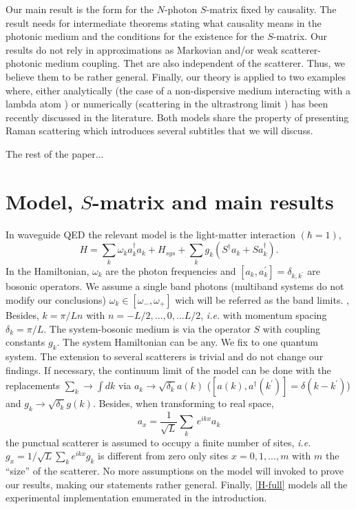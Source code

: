 \documentclass[notitlepage, prx, preprint, amsmath,superscriptaddress,amssymb]{revtex4-1}
\begin{document}
Our main result is the form for  the $N$-photon $S$-matrix  fixed by causality.   The result needs for intermediate  theorems stating what causality means  in the photonic medium  and the conditions for the existence for the $S$-matrix.  Our results do not rely in  approximations as Markovian and/or weak scatterer-photonic medium coupling. Thet are also independent of the scatterer.   Thus, we believe them to be rather general.    
Finally, our theory is applied to  two examples where, either analytically (the case of  a non-dispersive medium interacting with a lambda atom \cite{Xu2016}) or numerically (scattering in the ultrastrong limit \cite{Sanchez-Burillo2014, Sanchez-Burillo2015}) has been recently discussed in the literature.   Both models share the property of  presenting Raman scattering which introduces several subtitles that we will discuss. 


The rest of the paper...




\section{Model, $S$-matrix and main results} 


In waveguide QED the relevant model is the  light-matter interaction $(\hbar=1)$, 
\begin{equation}
H = \sum_k \omega_k a_k^\dagger a_k + H_{sys} + \sum_k g_k (S^\dagger a_k + S a_k^\dagger).
\label{H-full}
\end{equation}
  In the Hamiltonian, $\omega_k$ are the photon frequencies and $[a_k, a_k^\prime]= \delta_{k, k^\prime}$ are bosonic operators.  We assume a single band photons (multiband systems do not modify our conclusions)  $\omega_k \in [\omega_-, \omega_+]$ wich will be referred as the band limits. ,
Besides,  $k = \pi /L n$ with $n=-L/2, ..., 0, ... L/2$, \emph{i.e.} with momentum spacing $\delta_k = \pi / L$.  The system-bosonic medium is via the operator $S$ with coupling constants $g_k$.    The system Hamiltonian  can be  any. 
We fix to one quantum system.  The extension to several scatterers  is trivial and do not change our findings.   If necessary,  the continuum limit of the model can be done with the replacements $\sum_k \to \int  dk$ via $a_k \to \sqrt{\delta_k} a(k)$ ($[a (k), a^\dagger (k^\prime)]= \delta(k-k^\prime)$) and $g_k \to \sqrt{\delta_k} g(k)$.
Besides, when transforming to real space,
\begin{equation}
a_x = \frac{1}{\sqrt{L} }\sum_k  \, e^{i k x} a_k  
\end{equation}
the punctual scatterer is assumed to occupy a finite number of sites, \emph{i.e.} $g_x = 1/\sqrt{L} \sum_k e^{i k x} g_k$ is different from zero only sites $x=0, 1, ..., m$ with $m$ the ``size'' of the scatterer.  No more assumptions on the model  will  invoked to prove our results, making our statements rather general. Finally, \eqref{H-full} models all the experimental implementation enumerated in the introduction.
\end{document}
